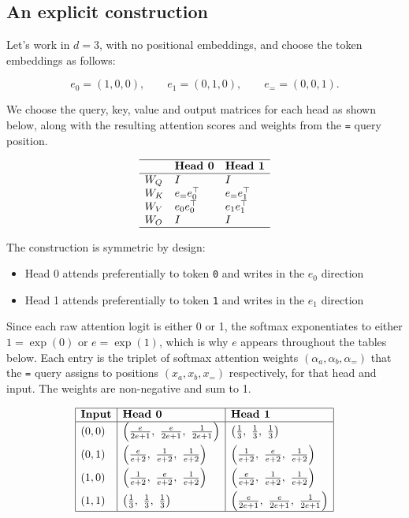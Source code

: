 \documentclass[
  11pt,
]{article}
\providecommand{\tightlist}{%
  \setlength{\itemsep}{0pt}\setlength{\parskip}{0pt}}
\begin{document}
\subsection{An explicit construction}\label{an-explicit-construction}

Let's work in \(d=3\), with no positional embeddings, and choose the
token embeddings as follows:

\[
e_0=(1,0,0),\qquad e_1=(0,1,0),\qquad e_{=}=(0,0,1).
\]

We choose the query, key, value and output matrices for each head as
shown below, along with the resulting attention scores and weights from
the \texttt{=} query position.

\[
\begin{array}{lll} \hline & \textbf{Head 0} & \textbf{Head 1} \\ \hline W_Q & I & I \\ W_K & e_{=} e_0^\top & e_{=} e_1^\top \\ W_V & e_0 e_0^\top & e_1 e_1^\top \\ W_O & I & I \\ \hline \end{array}
\]

The construction is symmetric by design:

\begin{itemize}
\tightlist
\item
  Head 0 attends preferentially to token \texttt{0} and writes in the
  \(e_0\) direction
\item
  Head 1 attends preferentially to token \texttt{1} and writes in the
  \(e_1\) direction
\end{itemize}

Since each raw attention logit is either 0 or 1, the softmax
exponentiates to either \(1=\exp(0)\) or \(e = \exp(1)\), which is why
\(e\) appears throughout the tables below. Each entry is the triplet of
softmax attention weights \((\alpha_a, \alpha_b, \alpha_=)\) that the
\texttt{=} query assigns to positions \((x_a, x_b, x_=)\) respectively,
for that head and input. The weights are non-negative and sum to 1.

\[
\begin{array}{|l|l|l|} \hline \textbf{Input} & \textbf{Head 0} & \textbf{Head 1} \\ \hline (0,0) & \left(\tfrac{e}{2e+1},\ \tfrac{e}{2e+1},\ \tfrac{1}{2e+1}\right) & \left(\tfrac{1}{3},\ \tfrac{1}{3},\ \tfrac{1}{3}\right) \\[6pt] (0,1) & \left(\tfrac{e}{e+2},\ \tfrac{1}{e+2},\ \tfrac{1}{e+2}\right) & \left(\tfrac{1}{e+2},\ \tfrac{e}{e+2},\ \tfrac{1}{e+2}\right) \\[6pt] (1,0) & \left(\tfrac{1}{e+2},\ \tfrac{e}{e+2},\ \tfrac{1}{e+2}\right) & \left(\tfrac{e}{e+2},\ \tfrac{1}{e+2},\ \tfrac{1}{e+2}\right) \\[6pt] (1,1) & \left(\tfrac{1}{3},\ \tfrac{1}{3},\ \tfrac{1}{3}\right) & \left(\tfrac{e}{2e+1},\ \tfrac{e}{2e+1},\ \tfrac{1}{2e+1}\right) \\ \hline \end{array}
\]
\end{document}
